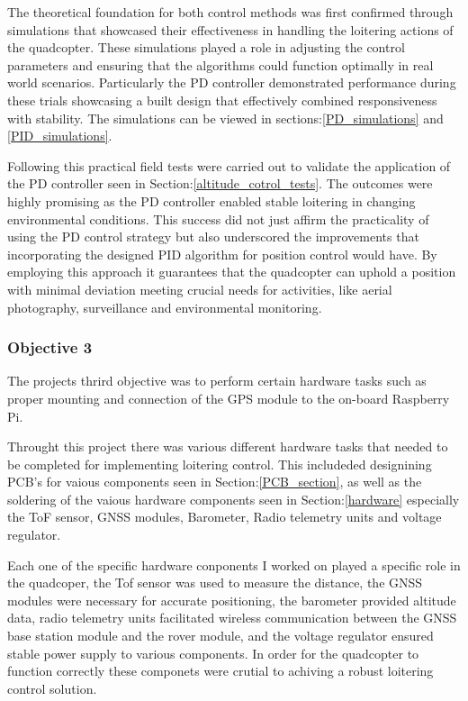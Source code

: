 \documentclass{report}
\begin{document}
The theoretical foundation for both control methods was first confirmed through
simulations that showcased their effectiveness in handling the loitering actions
of the quadcopter. These simulations played a role in adjusting the control
parameters and ensuring that the algorithms could function optimally in real
world scenarios. Particularly the PD controller demonstrated performance during
these trials showcasing a built design that effectively combined responsiveness
with stability. The simulations can be viewed in sections:\ref{PD_simulations}
and \ref{PID_simulations}.

Following this practical field tests were carried out to validate the
application of the PD controller seen in Section:\ref{altitude_cotrol_tests}.
The outcomes were highly promising as the PD controller enabled stable loitering
in changing environmental conditions. This success did not just affirm the
practicality of using the PD control strategy but also underscored the
improvements that incorporating the designed PID algorithm for position control
would have. By employing this approach it guarantees that the quadcopter can
uphold a position with minimal deviation meeting crucial needs for activities,
like aerial photography, surveillance and environmental monitoring.

\subsubsection*{Objective 3}
The projects thrird objective was to perform certain hardware tasks such as
proper mounting and connection of the GPS module to the on-board Raspberry Pi.

Throught this project there was various different hardware tasks that needed to
be completed for implementing loitering control. This includeded designining
PCB's for vaious components seen in Section:\ref{PCB_section}, as well as the
soldering of the vaious hardware components seen in Section:\ref{hardware}
especially the ToF sensor, GNSS modules, Barometer, Radio telemetry units and
voltage regulator. 

Each one of the specific hardware conponents I worked on played a specific role
in the quadcoper, the Tof sensor was used to measure the distance, the GNSS
modules were necessary for accurate positioning, the barometer provided altitude
data, radio telemetry units facilitated wireless communication between the GNSS
base station module and the rover module, and the voltage regulator ensured
stable power supply to various components. In order for the quadcopter to
function correctly these componets were crutial to achiving a robust loitering
control solution.
\end{document}
